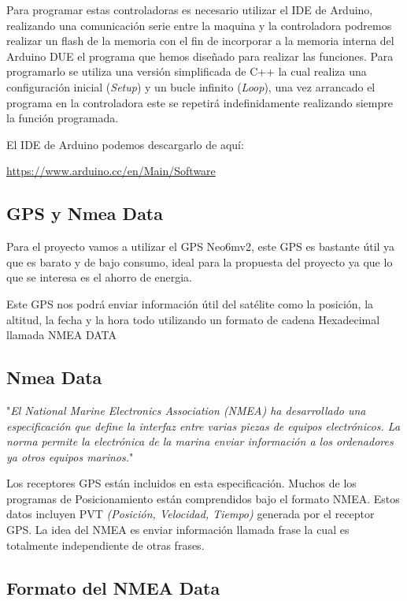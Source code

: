 \setlength{\parindent}{0ex}Para programar estas controladoras es necesario utilizar el IDE de Arduino, realizando una comunicación serie entre la maquina y la controladora podremos realizar un flash de la memoria con el fin de incorporar a la memoria interna del Arduino DUE el programa que hemos diseñado para realizar las funciones. 
Para programarlo se utiliza una versión simplificada de C++ la cual realiza una configuración inicial (\textit{Setup}) y un bucle infinito (\textit{Loop}), una vez arrancado el programa en la controladora este se repetirá indefinidamente realizando siempre la función programada. 

El IDE de Arduino podemos descargarlo de aquí:

\url{https://www.arduino.cc/en/Main/Software}

\subsection{GPS y Nmea Data}

Para el proyecto vamos a utilizar el GPS Neo6mv2, este GPS es bastante útil ya que es barato y de bajo consumo, ideal para la propuesta del proyecto ya que lo que se interesa es el ahorro de energia.

Este GPS nos podrá enviar información útil del satélite como la posición, la altitud, la fecha y la hora todo utilizando un formato de cadena Hexadecimal llamada NMEA DATA

\subsection{Nmea Data}

"\textit{El National Marine Electronics Association (NMEA) ha desarrollado una especificación que define la interfaz entre varias piezas de equipos electrónicos. La norma permite la electrónica de la  marina enviar información a los ordenadores ya otros equipos marinos.}"\cite{NEO6mv2}

Los receptores GPS están incluidos en esta especificación. Muchos de los programas de Posicionamiento están comprendidos bajo el formato NMEA. Estos datos incluyen PVT \textit{(Posición, Velocidad, Tiempo)} generada por el receptor GPS. La idea del NMEA es enviar información llamada frase la cual es totalmente independiente de otras frases.

\subsection{Formato del NMEA Data}

